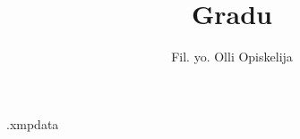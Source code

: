 

\begin{filecontents*}{\jobname.xmpdata}
\end{filecontents*}
\documentclass[a4paper,pdfa,pdfpagelabels,colorlinks]{utugradu2020}  %

\usepackage[utf8]{inputenc} %
\usepackage[T1]{fontenc}      %
\usepackage[finnish]{babel} %
\usepackage{tytiivis} %
\usepackage{graphicx}%
\usepackage{lastpage}
\usepackage[sort&compress, comma, square, numbers]{natbib} %
\usepackage{amssymb, amsthm, amsmath}
\usepackage{mathtools}

\usepackage{icomma}


\usepackage[a-3b]{pdfx}  %
\usepackage{hyperref} %


%
\newcommand{\mathbi}[1]{\textbf{\em #1}}



\title{Gradu}  %
\author{Fil. yo. Olli Opiskelija}  %
\maketitle
\newpage
\thispagestyle{empty}
\vspace*{10cm}

